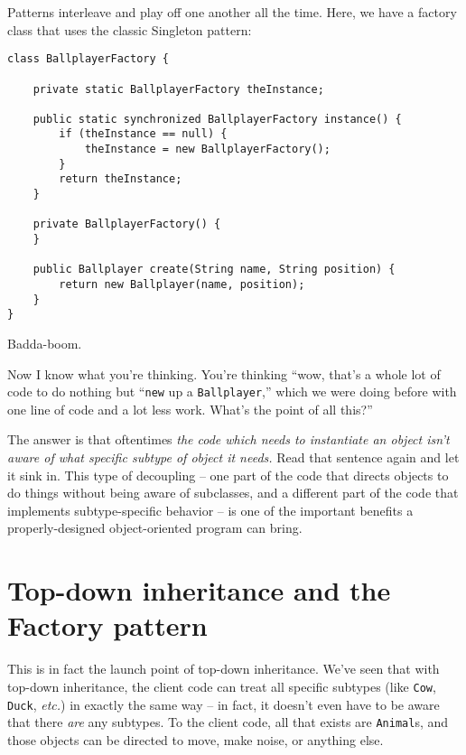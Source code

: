 Patterns interleave and play off one another all the time. Here, we have a
factory class that uses the classic Singleton pattern:

\begin{Verbatim}[fontsize=\small,samepage=true,frame=single]
class BallplayerFactory {

    private static BallplayerFactory theInstance;
    
    public static synchronized BallplayerFactory instance() {
        if (theInstance == null) {
            theInstance = new BallplayerFactory();
        }
        return theInstance;
    }

    private BallplayerFactory() {
    }

    public Ballplayer create(String name, String position) {
        return new Ballplayer(name, position);
    }
}
\end{Verbatim}

Badda-boom.

Now I know what you're thinking. You're thinking ``wow, that's a whole lot of
code to do nothing but ``\texttt{new} up a \texttt{Ballplayer},'' which we were
doing before with one line of code and a lot less work. What's the point of
all this?''

The answer is that oftentimes \textit{the code which needs to instantiate an
object isn't aware of what specific subtype of object it needs.} Read that
sentence again and let it sink in. This type of decoupling -- one part of the
code that directs objects to do things without being aware of subclasses, and
a different part of the code that implements subtype-specific behavior -- is
one of the important benefits a properly-designed object-oriented program can
bring.

\section{Top-down inheritance and the Factory pattern}

This is in fact the launch point of top-down inheritance. We've seen that with
top-down inheritance, the client code can treat all specific subtypes (like
\texttt{Cow}, \texttt{Duck}, \textit{etc.}) in exactly the same way -- in
fact, it doesn't even have to be aware that there \textit{are} any subtypes.
To the client code, all that exists are \texttt{Animal}s, and those objects
can be directed to move, make noise, or anything else.

